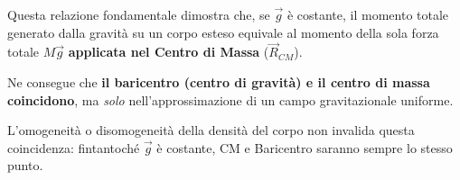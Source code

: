 Questa relazione fondamentale dimostra che, se $\vec{g}$ è costante, il momento totale generato dalla gravità su un corpo esteso equivale al momento della sola forza totale $M\vec{g}$ \textbf{applicata nel Centro di Massa} ($\vec{R}_{CM}$). 

Ne consegue che \textbf{il baricentro (centro di gravità) e il centro di massa coincidono}, ma \textit{solo} nell'approssimazione di un campo gravitazionale uniforme.
\begin{osservazione}{}
L'omogeneità o disomogeneità della densità del corpo non invalida questa coincidenza: fintantoché $\vec{g}$ è costante, CM e Baricentro saranno sempre lo stesso punto.
\end{osservazione}

